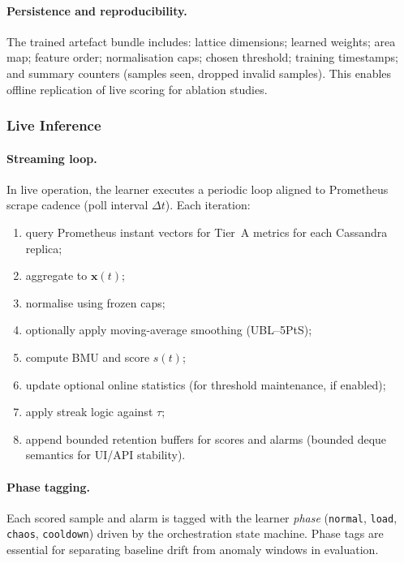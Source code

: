 \documentclass[11pt,a4paper]{article}
\begin{document}
\paragraph{Persistence and reproducibility.}
The trained artefact bundle includes: lattice dimensions; learned weights; area map; feature order; normalisation caps; chosen threshold; training timestamps; and summary counters (samples seen, dropped invalid samples). This enables offline replication of live scoring for ablation studies.

\subsubsection{Live Inference}
\label{subsubsec:live-inference}

\paragraph{Streaming loop.}
In live operation, the learner executes a periodic loop aligned to Prometheus scrape cadence (poll interval $\Delta t$). Each iteration:
\begin{enumerate}[leftmargin=*]
  \item query Prometheus instant vectors for Tier~A metrics for each Cassandra replica;
  \item aggregate to $\mathbf{x}(t)$;
  \item normalise using frozen caps;
  \item optionally apply moving-average smoothing (UBL--5PtS);
  \item compute BMU and score $s(t)$;
  \item update optional online statistics (for threshold maintenance, if enabled);
  \item apply streak logic against $\tau$;
  \item append bounded retention buffers for scores and alarms (bounded deque semantics for UI/API stability).
\end{enumerate}

\paragraph{Phase tagging.}
Each scored sample and alarm is tagged with the learner \emph{phase} (\texttt{normal}, \texttt{load}, \texttt{chaos}, \texttt{cooldown}) driven by the orchestration state machine. Phase tags are essential for separating baseline drift from anomaly windows in evaluation.
\end{document}
